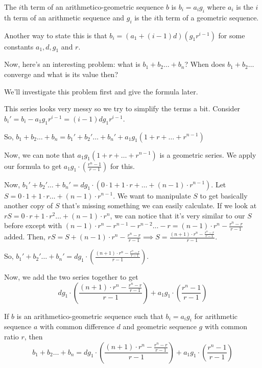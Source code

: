 \documentclass[11pt]{article}
\begin{document}
\begin{defi}
The $i$th term of an arithmetico-geometric sequence $b$ is $b_{i}=a_{i}g_{i}$ where $a_{i}$ is the $i$th term of an arithmetic sequence and $g_{i}$ is the $i$th term of a geometric sequence.

Another way to state this is that $b_{i}=(a_{1}+(i-1)d)(g_{1}r^{i-1})$ for some constants $a_{1},d,g_{1}$ and $r$.
\end{defi}

Now, here's an interesting problem: what is $b_{1}+b_{2}\ldots+b_{n}$? When does $b_{1}+b_{2}\ldots $ converge and what is its value then?

We'll investigate this problem first and give the formula later.
\begin{pro}
This series looks very messy so we try to simplify the terms a bit.
Consider $b_{i}'=b_{i}-a_{1}g_{1}r^{i-1}=(i-1)dg_{1}r^{i-1}$.

So, $b_{1}+b_{2}\ldots + b_{n}=b_{1}'+b_{2}'\ldots + b_{n}'+a_{1}g_{1}(1+r+\ldots + r^{n-1})$

Now, we can note that $a_{1}g_{1}(1+r+\ldots + r^{n-1})$ is a geometric series. We apply our formula to get $a_{1}g_{1}\cdot (\frac{r^{n}-1}{r-1})$ for this.

Now, $b_{1}'+b_{2}'\ldots + b_{n}'=dg_{1}\cdot (0\cdot 1+1\cdot r+\ldots + (n-1)\cdot r^{n-1})$. Let $S=0\cdot 1+1\cdot r \ldots + (n-1)\cdot r^{n-1}$. We want to manipulate $S$ to get basically another copy of $S$ that's missing something we can easily calculate. If we look at $rS=0\cdot r+1\cdot r^2\ldots +(n-1)\cdot r^{n}$, we can notice that it's very similar to our $S$ before except with $(n-1)\cdot r^{n}-r^{n-1}-r^{n-2}\ldots-r=(n-1)\cdot r^{n}-\frac{r^{n}-r}{r-1}$ added. Then, $rS=S+(n-1)\cdot r^{n}-\frac{r^{n}-r}{r-1}\implies S=\frac{(n+1)\cdot r^{n}-\frac{r^{n}-r}{r-1}}{r-1}$.

So, $b_{1}'+b_{2}'\ldots + b_{n}'=dg_{1}\cdot (\frac{(n+1)\cdot r^{n}-\frac{r^{n}-r}{r-1}}{r-1})$.

Now, we add the two series together to get
$$dg_{1}\cdot (\frac{(n+1)\cdot r^{n}-\frac{r^{n}-r}{r-1}}{r-1})+a_{1}g_{1}\cdot (\frac{r^{n}-1}{r-1})$$
\end{pro}

\begin{theo}
If $b$ is an arithmetico-geometric sequence such that $b_{i}=a_{i}g_{i}$ for arithmetic sequence $a$ with common difference $d$ and geometric sequence $g$ with common ratio $r$, then
$$b_{1}+b_{2}\ldots + b_{n} = dg_{1}\cdot (\frac{(n+1)\cdot r^{n}-\frac{r^{n}-r}{r-1}}{r-1})+a_{1}g_{1}\cdot (\frac{r^{n}-1}{r-1})$$
\end{theo}
\end{document}
